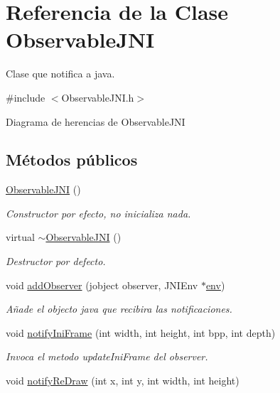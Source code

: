\hypertarget{classObservableJNI}{\section{Referencia de la Clase Observable\-J\-N\-I}
\label{classObservableJNI}
}


Clase que notifica a java.  




{\ttfamily \#include $<$Observable\-J\-N\-I.\-h$>$}



Diagrama de herencias de Observable\-J\-N\-I
\subsection*{Métodos públicos}
\begin{DoxyCompactItemize}
\item 
\hyperlink{classObservableJNI_a934d22156cf5219cfe0a840b95e7709b}{Observable\-J\-N\-I} ()
\begin{DoxyCompactList}\small\item\em Constructor por efecto, no inicializa nada. \end{DoxyCompactList}\item 
virtual \hyperlink{classObservableJNI_a3a945cd9dd86a5d8100ee1419e50afce}{$\sim$\-Observable\-J\-N\-I} ()
\begin{DoxyCompactList}\small\item\em Destructor por defecto. \end{DoxyCompactList}\item 
void \hyperlink{classObservableJNI_ae8fe89634934a94aa315320817a75d81}{add\-Observer} (jobject observer, J\-N\-I\-Env $\ast$\hyperlink{classObservableJNI_a8d0b0f613e2cff5fa51cd9fcfc161d3f}{env})
\begin{DoxyCompactList}\small\item\em Añade el objecto java que recibira las notificaciones. \end{DoxyCompactList}\item 
void \hyperlink{classObservableJNI_ade6b8675bd964566f4a2a0b63f704dda}{notify\-Ini\-Frame} (int width, int height, int bpp, int depth)
\begin{DoxyCompactList}\small\item\em Invoca el metodo update\-Ini\-Frame del observer. \end{DoxyCompactList}\item 
void \hyperlink{classObservableJNI_a1a376a0653883311533d4786675c8de0}{notify\-Re\-Draw} (int x, int y, int width, int height)

\end{DoxyCompactItemize}
